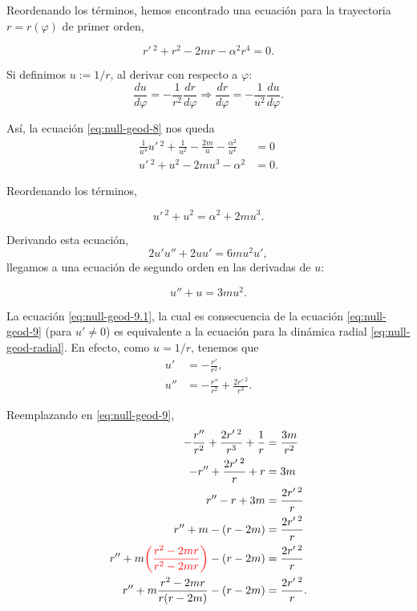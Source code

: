 \documentclass[letterpaper,11pt]{article}
\begin{document}
Reordenando los términos, hemos encontrado una ecuación para la trayectoria $r = r(\varphi)$ de primer orden,
\begin{shaded}
\begin{equation}
r'\,^2 + r^2 - 2mr-\alpha^2 r^4 = 0. \label{eq:null-geod-8}
\end{equation}
\end{shaded}

Si definimos $u := 1/r$, al derivar con respecto a $\varphi$:
\begin{equation}
\frac{du}{d\varphi} = - \frac{1}{r^2} \frac{dr}{d\varphi} \Rightarrow \frac{dr}{d\varphi} = - \frac{1}{u^2} \frac{du}{d\varphi}.
\end{equation}

Así, la ecuación \eqref{eq:null-geod-8} nos queda
\begin{align}
\frac{1}{u^4} u'\,^2 + \frac{1}{u^2} - \frac{2m}{u} - \frac{\alpha^2}{u^4} &= 0 \\
u'\,^2 + u^2 - 2mu^3 - \alpha^2&= 0.
\end{align}

Reordenando los términos, 
\begin{shaded}
\begin{equation}
u'\,^2 + u^2 = \alpha^2 + 2mu^3. \label{eq:null-geod-9}
\end{equation}
\end{shaded}

Derivando esta ecuación, 
\begin{equation}
2u'u'' + 2uu' = 6mu^2 u',
\end{equation}
llegamos a una ecuación de segundo orden en las derivadas de $u$:
\begin{shaded}
\begin{equation}
u'' + u = 3 m u^2. \label{eq:null-geod-9.1}
\end{equation}
\end{shaded}

La ecuación \eqref{eq:null-geod-9.1}, la cual es consecuencia de la ecuación \eqref{eq:null-geod-9} (para $u' \neq 0$) es equivalente a la ecuación para la dinámica radial \eqref{eq:null-geod-radial}. En efecto, como $u = 1/r$, tenemos que
\begin{align}
u' &= - \frac{r'}{r^2}, \\
u'' &= - \frac{r''}{r^2} + \frac{2r'\,^2}{r^3}.
\end{align}

Reemplazando en \eqref{eq:null-geod-9}, 
\begin{align}
- \frac{r''}{r^2} + \frac{2r'\,^2}{r^3} + \frac{1}{r} &= \frac{3m}{r^2} \\
-r'' + \frac{2r'\,^2}{r} + r &= 3m \\
r'' -r + 3m &= \frac{2r'\,^2}{r} \\
r'' + m - (r-2m) &= \frac{2r'\,^2}{r} \\
r'' + m \textcolor{red}{\left(\frac{r^2 - 2m r}{r^2-2m r}\right)} - (r-2m) &= \frac{2r'\,^2}{r} \\
r'' + m \frac{r^2 - 2m r}{r(r-2m)} - (r-2m) &= \frac{2r'\,^2}{r}.\label{eq:null-geod-9.2}
\end{align}
\end{document}
